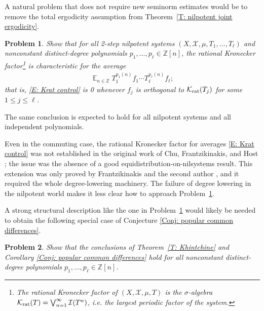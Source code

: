 \documentclass[11pt]{amsart}
\newtheorem{problem}{Problem}
\theoremstyle{definition}
\DeclareMathOperator*{\E}{\mathbb{E}}
\newcommand{\Z}{{\mathbb Z}}
\newcommand{\CI}{{\mathcal I}}
\newcommand{\CK}{{\mathcal K}}
\newcommand{\CX}{{\mathcal X}}
\newcommand{\1}{{\mathbf{1}}}
\newcommand{\Krat}{{\CK_{\text{\rm rat}}}}
\begin{document}
A natural problem that does not require new seminorm estimates would be to remove the total ergodicity assumption from Theorem~\ref{T: nilpotent joint ergodicity}. 
\begin{problem}\label{Pr: Krat}
    Show that for all 2-step nilpotent systems $(X, \CX, \mu, T_1, \ldots, T_\ell)$ and nonconstant distinct-degree polynomials $p_1, \ldots, p_\ell\in\Z[n]$, the rational Kronecker factor\footnote{The \textit{rational Kronecker factor} of $(X, \CX, \mu, T)$ is the $\sigma$-algebra $\Krat(T) = \bigvee_{n=1}^\infty \CI(T^n)$, i.e. the largest periodic factor of the system.} is characteristic for the average
    \begin{align}\label{E: Krat control}
        \E_{n\in\Z}T_1^{p_1(n)}f_1\cdots T_\ell^{p_\ell(n)}f_\ell;
    \end{align}
    that is, \eqref{E: Krat control} is 0 whenever $f_j$ is orthogonal to $\Krat(T_j)$ for some $1\leq j\leq \ell$.
\end{problem}
The same conclusion is expected to hold for all nilpotent systems and all independent polynomials. 

Even in the commuting case, the rational Kronecker factor for averages \eqref{E: Krat control} was not established in the original work of Chu, Frantzikinakis, and Host \cite{CFH11}; the issue was the absence of a good equidistribution-on-nilsystems result. This extension was only proved by Frantzikinakis and the second author \cite{FrKu22a}, and it required the whole degree-lowering machinery. The failure of degree lowering in the nilpotent world makes it less clear how to approach Problem~\ref{Pr: Krat}. 

{A strong structural description like the one in Problem~\ref{Pr: Krat} would likely be needed to obtain the following special case of Conjecture \ref{Conj: popular common differences}.
\begin{problem}
    Show that the conclusions of Theorem~\ref{T: Khintchine} and Corollary \ref{Conj: popular common differences} hold for all nonconstant distinct-degree polynomials $p_1, \ldots, p_\ell\in\Z[n]$.
\end{problem}
}
\end{document}
